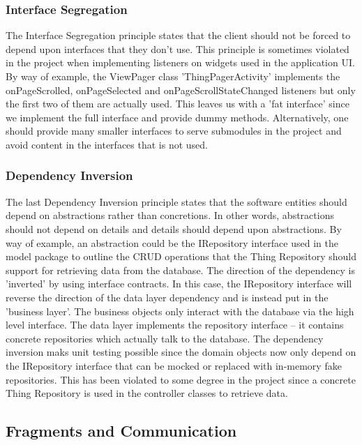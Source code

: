 \documentclass{article} %
\begin{document}
\subsubsection{Interface Segregation}

The Interface Segregation principle states that the client should not be forced to depend upon interfaces that they don't use. This principle is sometimes violated in the project when implementing listeners on widgets used in the application UI. By way of example, the ViewPager class 'ThingPagerActivity' implements the onPageScrolled, onPageSelected and onPageScrollStateChanged listeners but only the first two of them are actually used. This leaves us with a 'fat interface' since we implement the full interface and provide dummy methods. Alternatively, one should provide many smaller interfaces to serve submodules in the project and avoid content in the interfaces that is not used. 

\subsubsection{Dependency Inversion}

The last Dependency Inversion principle states that the software entities should depend on abstractions rather than concretions. In other words, abstractions should not depend on details and details should depend upon abstractions. By way of example, an abstraction could be the IRepository interface used in the model package to outline the CRUD operations that the Thing Repository should support for retrieving data from the database. The direction of the dependency is 'inverted' by using interface contracts. In this case, the IRepository interface will reverse the direction of the data layer dependency and is instead put in the 'business layer'. The business objects only interact with the database via the high level interface. The data layer implements the repository interface – it contains concrete repositories which actually talk to the database. The dependency inversion maks unit testing possible since the domain objects now only depend on the IRepository interface that can be mocked or replaced with in-memory fake repositories. This has been violated to some degree in the project since a concrete Thing Repository is used in the controller classes to retrieve data.

\subsection{Fragments and Communication}
\end{document}
